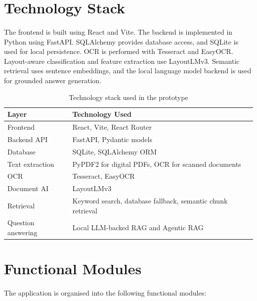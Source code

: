 \section{Technology Stack}
\paragraph{} The frontend is built using React and Vite. The backend is implemented in Python using FastAPI. SQLAlchemy provides database access, and SQLite is used for local persistence. OCR is performed with Tesseract and EasyOCR. Layout-aware classification and feature extraction use LayoutLMv3. Semantic retrieval uses sentence embeddings, and the local language model backend is used for grounded answer generation.

\begin{table}[h]
\centering
\begin{tabular}{ll}
\toprule
\textbf{Layer} & \textbf{Technology Used} \\
\midrule
Frontend & React, Vite, React Router \\
Backend API & FastAPI, Pydantic models \\
Database & SQLite, SQLAlchemy ORM \\
Text extraction & PyPDF2 for digital PDFs, OCR for scanned documents \\
OCR & Tesseract, EasyOCR \\
Document AI & LayoutLMv3 \\
Retrieval & Keyword search, database fallback, semantic chunk retrieval \\
Question answering & Local LLM-backed RAG and Agentic RAG \\
\bottomrule
\end{tabular}
\caption{Technology stack used in the prototype}
\label{tab:technology_stack}
\end{table}

\section{Functional Modules}
\paragraph{} The application is organised into the following functional modules:

